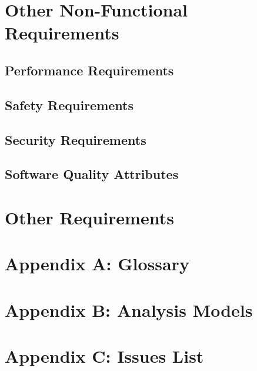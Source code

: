 \documentclass[10pt,a4paper,titlepage]{article}
\begin{document}
	\section{Other Non-Functional Requirements}
	\subsection{Performance Requirements}
	\subsection{Safety Requirements}
	\subsection{Security Requirements}
	\subsection{Software Quality Attributes}

	\section{Other Requirements}

	\section{Appendix A: Glossary}

	\section{Appendix B: Analysis Models}

	\section{Appendix C: Issues List}
\end{document}
